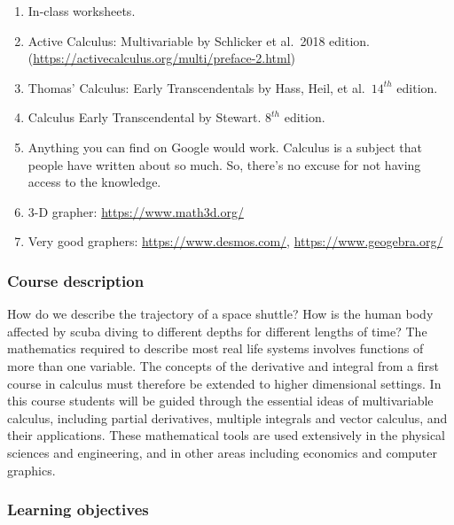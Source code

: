 \documentclass[
]{article}
\begin{document}
\begin{enumerate}
\def\labelenumi{\arabic{enumi}.}
\item
  In-class worksheets.
\item
  Active Calculus: Multivariable by Schlicker et al.~2018 edition.
  (\url{https://activecalculus.org/multi/preface-2.html})
\item
  Thomas' Calculus: Early Transcendentals by Hass, Heil, et al.~\(14^{th}\) edition.
\item
  Calculus Early Transcendental by Stewart. \(8^{th}\) edition.
\item
  Anything you can find on Google would work.
  Calculus is a subject that people have written about
  so much. So, there's no excuse for not having access
  to the knowledge.
\item
  3-D grapher: \url{https://www.math3d.org/}
\item
  Very good graphers: \url{https://www.desmos.com/}, \url{https://www.geogebra.org/}
\end{enumerate}

\hypertarget{course-description}{%
\subsubsection*{Course description}\label{course-description}}

How do we describe the trajectory of a space shuttle? How is the human body affected by
scuba diving to different depths for different lengths of time? The mathematics required to
describe most real life systems involves functions of more than one variable. The concepts
of the derivative and integral from a first course in calculus must therefore be extended to
higher dimensional settings. In this course students will be guided through the essential ideas
of multivariable calculus, including partial derivatives, multiple integrals and vector calculus,
and their applications. These mathematical tools are used extensively in the physical sciences
and engineering, and in other areas including economics and computer graphics.

\hypertarget{learning-objectives}{%
\subsubsection*{Learning objectives}\label{learning-objectives}}
\end{document}

